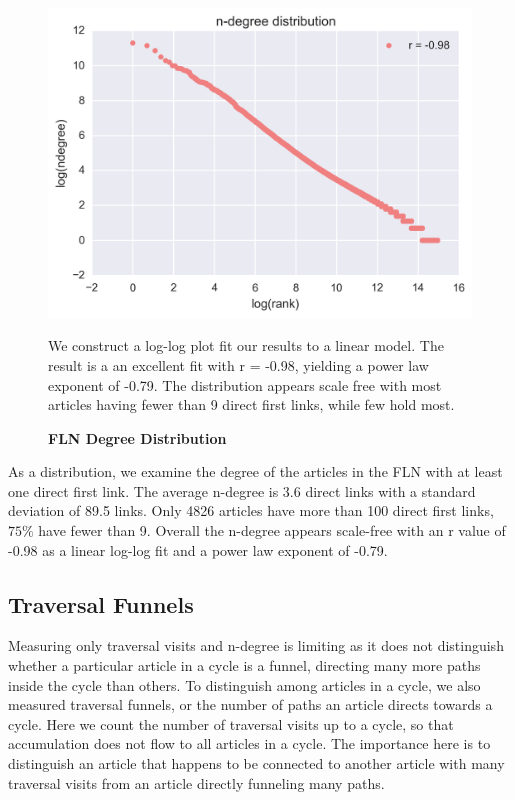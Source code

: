 \documentclass[pre,twocolumn,twoside,superscriptaddress,floatfix, aps, 10pt]{revtex4-1}
\begin{document}
\begin{figure}[tp!]
  \centering	
  \includegraphics[width=\columnwidth]{graphics/ndegree_loglog.png}
  \caption{
    \textbf{FLN Degree Distribution}
  }
  We construct a log-log plot fit our results to a linear model. The result is a 
  an excellent fit with r = -0.98, yielding a power law exponent of -0.79. 
  The distribution appears scale free with most articles having fewer than 9 
  direct first links, while few hold most.
  \label{fig:degree distribution}

\end{figure}
As a distribution, we examine the degree of the articles in the FLN with at least
one direct first link. The average n-degree 
is 3.6 direct links with a standard deviation of 89.5 links.
Only 4826 articles have more than 100 direct first links, $75\%$ have fewer than 
9. Overall the n-degree appears scale-free with an r value of -0.98 as a linear log-log fit and a power law exponent of -0.79. 



\subsection{Traversal Funnels}

Measuring only traversal visits and n-degree is limiting as it does not distinguish whether a particular article in a cycle 
is a funnel, directing many more paths inside the cycle than others. 
To distinguish among articles in a cycle, we also measured traversal funnels, or the number of 
paths an article directs towards a cycle. Here we count the number of traversal visits up to a cycle, 
so that accumulation does not flow to all articles in a cycle.
The importance here is to distinguish an article that happens to be connected to another article with many traversal visits 
from an article directly funneling many paths.
\end{document}
